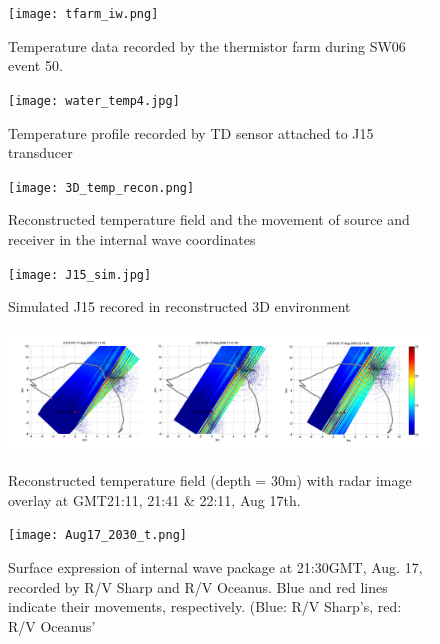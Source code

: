  \begin{figure}[h]
\centering
  \texttt{[image: tfarm\_iw.png]}\\
  \caption{Temperature data recorded by the thermistor farm during SW06 event 50. }
  \label{fig:tfarm_dir}
\end{figure}

\begin{figure}[h]
\centering
  \texttt{[image: water\_temp4.jpg]}\\
  \caption{Temperature profile recorded by TD sensor attached to J15 transducer}
  \label{fig:water_temp4}
\end{figure}

\begin{figure}[h]
\centering
  \texttt{[image: 3D\_temp\_recon.png]}\\
  \caption{Reconstructed temperature field and the movement of source and receiver in the internal wave coordinates}
  \label{fig:water_temp4}
\end{figure}

\begin{figure}[h]
\centering
  \texttt{[image: J15\_sim.jpg]}\\
  \caption{Simulated J15 recored in reconstructed 3D environment}
  \label{fig:water_temp4}
\end{figure}

\begin{figure}[h]
\centering
  \includegraphics[width=\textwidth]{3D_interp_radar.png}\\
  \caption{Reconstructed temperature field (depth = 30m) with radar image overlay at GMT21:11, 21:41 \& 22:11, Aug 17th.}
  \label{fig: 3D_interp_radar}
\end{figure}




\clearpage
\begin{figure}[h]
  \centering
  \texttt{[image: Aug17\_2030\_t.png]}
  \caption{Surface expression of internal wave package at 21:30GMT, Aug. 17, recorded by R/V Sharp and R/V Oceanus. Blue and red lines indicate their movements, respectively. (Blue: R/V Sharp's, red: R/V Oceanus'}\label{fig:r2130_r}
\end{figure}

